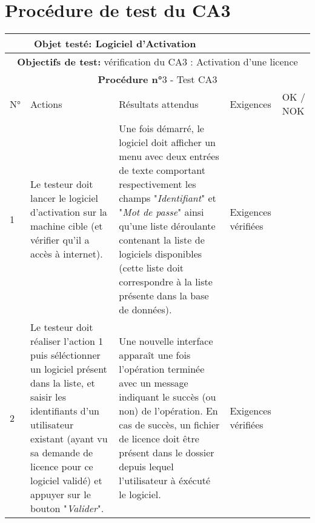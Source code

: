 \newpage

\section*{Procédure de test du CA3}
\begin{table}[!h]
        \centering
        \begin{tabular}{|m{0.6cm}|
                         >{\raggedright\arraybackslash}m{4cm}|
                         >{\raggedright\arraybackslash}m{6.4cm}|
                         >{\raggedright\arraybackslash}m{2cm}|
                         m{1cm}|}
            \hline
            \multicolumn{3}{|c|}{
                \textbf{Objet testé: } Logiciel d'Activation 
            } & \multicolumn{2}{|c|}{
                \textbf{Version: } version    
            } \\
            \hline
            \multicolumn{5}{|c|}{\textbf{Objectifs de test:} 
                vérification du CA3 : Activation d'une licence} \\
            \hline
            \multicolumn{5}{|c|}{
                \textbf{Procédure n°}3 - Test CA3
            } \\
            \hline
            N° & Actions & Résultats attendus & Exigences & OK / NOK \\
            \hline      %
            1 & Le testeur doit lancer le logiciel d'activation sur la
                machine cible (et vérifier qu'il a accès à internet). 
              & Une fois démarré, le logiciel doit afficher un menu avec 
                deux entrées de texte comportant respectivement les champs
                "\emph{Identifiant}" et "\emph{Mot de passe}" ainsi qu'une liste
                déroulante contenant la liste de logiciels disponibles
                (cette liste doit correspondre à la liste présente dans
                 la base de données).
              & Exigences vérifiées & \\
            \hline
            2 & Le testeur doit réaliser l'action 1 puis séléctionner 
                un logiciel présent dans la liste, et saisir les 
                identifiants d'un utilisateur existant (ayant vu sa demande 
                de licence pour ce logiciel validé) et appuyer sur le bouton
                "\emph{Valider}".  
              & Une nouvelle interface apparaît une fois l'opération terminée
                avec un message indiquant le succès (ou non) de l'opération.
                En cas de succès, un fichier de licence doit être présent 
                dans le dossier depuis lequel l'utilisateur à éxécuté le logiciel. 
              & Exigences vérifiées & \\
            \hline
        \end{tabular} 
        \label{tab:tab3}
\end{table}
\newpage

